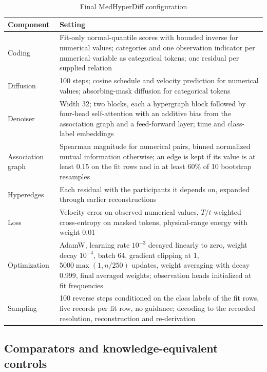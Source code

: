 \documentclass[pdflatex,referee]{sn-jnl}%
\begin{document}
\begin{table}[htbp]
\caption{Final MedHyperDiff configuration}
\label{tab:config}
\centering
\footnotesize
\setlength{\tabcolsep}{4pt}
\begin{tabular}{@{}p{}p{}@{}}
\toprule
Component & Setting \\
\midrule
Coding & Fit-only normal-quantile scores with bounded inverse for numerical values; categories and one observation indicator per numerical variable as categorical tokens; one residual per supplied relation \\
Diffusion & 100 steps; cosine schedule and velocity prediction for numerical values; absorbing-mask diffusion for categorical tokens \\
Denoiser & Width 32; two blocks, each a hypergraph block followed by four-head self-attention with an additive bias from the association graph and a feed-forward layer; time and class-label embeddings \\
Association graph & Spearman magnitude for numerical pairs, binned normalized mutual information otherwise; an edge is kept if its value is at least 0.15 on the fit rows and in at least 60\% of 10 bootstrap resamples \\
Hyperedges & Each residual with the participants it depends on, expanded through earlier reconstructions \\
Loss & Velocity error on observed numerical values, $T/t$-weighted cross-entropy on masked tokens, physical-range energy with weight 0.01 \\
Optimization & AdamW, learning rate $10^{-3}$ decayed linearly to zero, weight decay $10^{-4}$, batch 64, gradient clipping at 1, $5000\max(1, n/250)$ updates, weight averaging with decay 0.999, final averaged weights; observation heads initialized at fit frequencies \\
Sampling & 100 reverse steps conditioned on the class labels of the fit rows, five records per fit row, no guidance; decoding to the recorded resolution, reconstruction and re-derivation \\
\bottomrule
\end{tabular}
\end{table}

\subsection*{Comparators and knowledge-equivalent controls}
\end{document}
